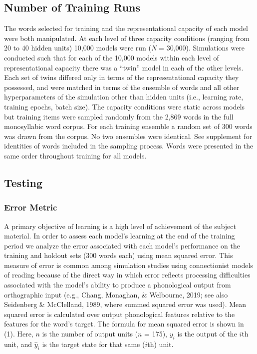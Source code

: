 \documentclass[
  ,man,floatsintext]{apa6}
\begin{document}
\hypertarget{number-of-training-runs}{%
\subsection{Number of Training Runs}\label{number-of-training-runs}}

The words selected for training and the representational capacity of each model were both manipulated. At each level of three capacity conditions (ranging from 20 to 40 hidden units) 10,000 models were run (\emph{N} = 30,000). Simulations were conducted such that for each of the 10,000 models within each level of representational capacity there was a ``twin'' model in each of the other levels. Each set of twins differed only in terms of the representational capacity they possessed, and were matched in terms of the ensemble of words and all other hyperparameters of the simulation other than hidden units (i.e., learning rate, training epochs, batch size). The capacity conditions were static across models but training items were sampled randomly from the 2,869 words in the full monosyllabic word corpus. For each training ensemble a random set of 300 words was drawn from the corpus. No two ensembles were identical. See supplement for identities of words included in the sampling process. Words were presented in the same order throughout training for all models.

\hypertarget{testing}{%
\subsection{Testing}\label{testing}}

\hypertarget{error-metric}{%
\subsubsection{Error Metric}\label{error-metric}}

A primary objective of learning is a high level of achievement of the subject material. In order to assess each model's learning at the end of the training period we analyze the error associated with each model's performance on the training and holdout sets (300 words each) using mean squared error. This measure of error is common among simulation studies using connectionist models of reading because of the direct way in which error reflects processing difficulties associated with the model's ability to produce a phonological output from orthographic input (e.g., Chang, Monaghan, \& Welbourne, 2019; see also Seidenberg \& McClelland, 1989, where summed squared error was used). Mean squared error is calculated over output phonological features relative to the features for the word's target. The formula for mean squared error is shown in (1). Here, \(n\) is the number of output units (\(n\) = 175), \(y_i\) is the output of the \(i\)th unit, and \(\hat{y}_i\) is the target state for that same (\(i\)th) unit.
\end{document}
